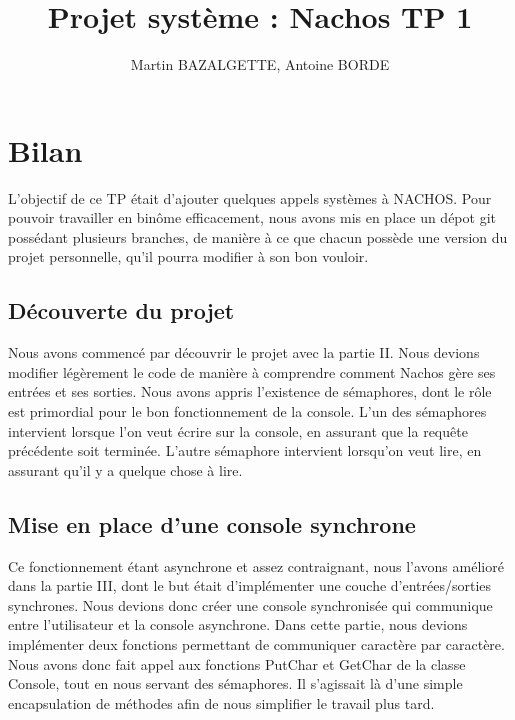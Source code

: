 \documentclass[12pt]{article}
\begin{document}
\title{Projet système : Nachos TP 1}
\author{Martin BAZALGETTE, Antoine BORDE}

\maketitle
\newpage
\tableofcontents
\newpage

\section{Bilan}
L'objectif de ce TP était d'ajouter quelques appels systèmes à NACHOS.
\newline
Pour pouvoir travailler en binôme efficacement, nous avons mis en place un dépot git possédant plusieurs branches, de manière à ce que chacun possède une version du projet personnelle, qu'il pourra modifier à son bon vouloir.

\bigbreak
\subsection{Découverte du projet}
Nous avons commencé par découvrir le projet avec la partie II. Nous devions modifier légèrement le code de manière à comprendre comment Nachos gère ses entrées et ses sorties.
Nous avons appris l'existence de sémaphores, dont le rôle est primordial pour le bon fonctionnement de la console.
L'un des sémaphores intervient lorsque l'on veut écrire sur la console, en assurant que la requête précédente soit terminée. L'autre sémaphore intervient lorsqu'on veut lire, en assurant qu'il y a quelque chose à lire.

\bigbreak
\subsection{Mise en place d'une console synchrone}
Ce fonctionnement étant asynchrone et assez contraignant, nous l'avons amélioré dans la partie III, dont le but était d'implémenter une couche d'entrées/sorties synchrones. Nous devions donc créer une console synchronisée qui communique entre l'utilisateur et la console asynchrone.
Dans cette partie, nous devions implémenter deux fonctions permettant de communiquer caractère par caractère. Nous avons donc fait appel aux fonctions \textcolor{red2}{PutChar} et \textcolor{red2}{GetChar} de la classe Console, tout en nous servant des sémaphores.
Il s'agissait là d'une simple encapsulation de méthodes afin de nous simplifier le travail plus tard.

\bigbreak
\end{document}
